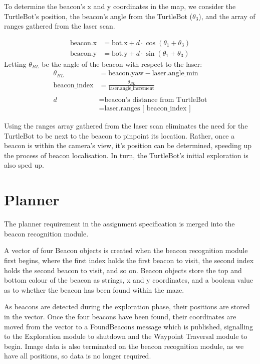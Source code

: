 \documentclass[titlepage,12pt,a4paper]{article}
\begin{document}
To determine the beacon's x and y coordinates in the map, we consider the TurtleBot's position, the beacon's angle from the TurtleBot ($\theta_3$), and the array of ranges gathered from the laser scan. 

\begin{align*}
	\text{beacon.x}		&=		\text{bot.x} + d \cdot \cos{(\theta_1 + \theta_3)} \\
	\text{beacon.y} 		&= 		\text{bot.y} + d \cdot \sin{(\theta_1 + \theta_3)} 
\end{align*}
Letting $\theta_{BL}$ be the angle of the beacon with respect to the laser: 
\begin{align*}
		\theta_{BL}	&= 		\text{beacon.yaw} - \text{laser.angle\_min} \\
   \text{beacon\_index}	&=		\frac{\theta_{BL}}{\text{laser.angle\_increment}} \\
   					 \\
				d 	&=		\text{beacon's distance from TurtleBot} \\
					&=		\text{laser.ranges [ beacon\_index ]} 
\end{align*}

Using the ranges array gathered from the laser scan eliminates the need for the TurtleBot to be next to the beacon to pinpoint its location. Rather, once a beacon is within the camera's view, it's position can be determined, speeding up the process of beacon localisation. In turn, the TurtleBot's initial exploration is also sped up.

\pagebreak
\section{Planner}

The planner requirement in the assignment specification is merged into the beacon recognition module.

A vector of four Beacon objects is created when the beacon recognition module first begins, where the first index holds the first beacon to visit, the second index holds the second beacon to visit, and so on. Beacon objects store the top and bottom colour of the beacon as strings, x and y coordinates, and a boolean value as to whether the beacon has been found within the maze. 

As beacons are detected during the exploration phase, their positions are stored in the vector. Once the four beacons have been found, their coordinates are moved from the vector to a FoundBeacons message which is published, signalling to the Exploration module to shutdown and the Waypoint Traversal module to begin. Image data is also terminated on the beacon recognition module, as we have all positions, so data is no longer required.
\end{document}
